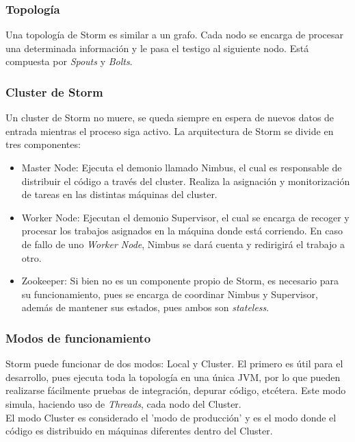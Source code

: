 	\subsubsection{Topología}

	Una topología de Storm es similar a un grafo. Cada nodo se encarga de procesar una determinada información y le pasa el testigo al siguiente nodo. Está compuesta por \textit{Spouts} y \textit{Bolts}.

	\subsubsection{Cluster de Storm}

	Un cluster de Storm no muere, se queda siempre en espera de nuevos datos de entrada mientras el proceso siga activo.
	La arquitectura de Storm se divide en tres componentes:
	\begin{itemize}
	\item Master Node: Ejecuta el demonio llamado Nimbus, el cual es responsable de distribuir el código a través del cluster. Realiza la asignación y monitorización de tareas en las distintas máquinas del cluster.
	\item Worker Node: Ejecutan el demonio Supervisor, el cual se encarga de recoger y procesar los trabajos asignados en la máquina donde está corriendo. En caso de fallo de uno \textit{Worker Node}, Nimbus se dará cuenta y redirigirá el trabajo a otro.
	\item Zookeeper: Si bien no es un componente propio de Storm, es necesario para su funcionamiento, pues se encarga de coordinar Nimbus y Supervisor, además de mantener sus estados, pues ambos son \textit{stateless}.
	\end{itemize}

	\subsubsection{Modos de funcionamiento}

	Storm puede funcionar de dos modos: Local y Cluster. El primero es útil para el desarrollo, pues ejecuta toda la topología en una única JVM, por lo que pueden realizarse fácilmente pruebas de integración, depurar código, etcétera. Este modo simula, haciendo uso de \textit{Threads}, cada nodo del Cluster.\\
	El modo Cluster es considerado el 'modo de producción' y es el modo donde el código es distribuido en máquinas diferentes dentro del Cluster.\\

